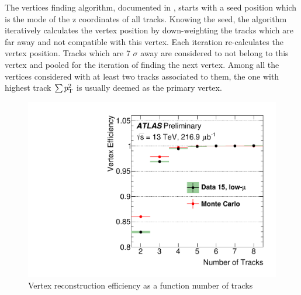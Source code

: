 
The vertices finding algorithm, documented in \cite{PERF-2015-01}, starts with a seed position which is the mode of the z coordinates of all tracks. Knowing the seed, the algorithm iteratively calculates the vertex position by down-weighting the tracks which are far away and not compatible with this vertex. Each iteration re-calculates the vertex position. Tracks which are 7 $\sigma$ away are considered to not belong to this vertex and pooled for the iteration of finding the next vertex. Among all the vertices considered with at least two tracks associated to them, the one with highest track $\sum p_{{\rm T}}^2$ is usually deemed as the primary vertex.

\begin{figure}[htpb!]
\begin{center}
  \includegraphics[width=0.55\linewidth]{figures/Reco/TrackingVertex}
\caption{Vertex reconstruction efficiency as a function number of tracks\cite{ATL-PHYS-PUB-2015-026}}
\label{fig:reco-primaryvertexeff}
\end{center}
\end{figure}



